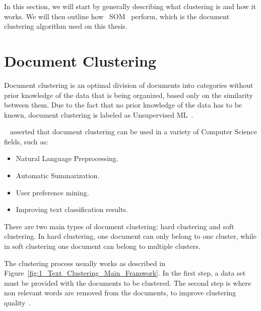 
In this section, we will start by generally describing what clustering is and how it works. We will then outline how ~\ac{SOM}~\cite{Kohonen1990} perform, which is the document clustering algorithm used on this thesis.

\section{Document Clustering}
\label{sec:clustering}
Document clustering is an optimal division of documents into categories without prior knowledge of the data that is being organized, based only on the similarity between them. Due to the fact that no prior knowledge of the data has to be known, document clustering is labeled as Unsupervised \ac{ML}~\cite{hinton1999unsupervised}.

~\citet{Liu2012b} asserted that document clustering can be used in a variety of Computer Science fields, such as:
\begin{itemize}
  \item Natural Language Preprocessing.
  \item Automatic Summarization.
  \item User preference mining.
  \item Improving text classification results.
\end{itemize}

There are two main types of document clustering: hard clustering and soft clustering. In hard clustering, one document can only belong to one cluster, while in soft clustering one document can belong to multiple clusters. 


The clustering process usually works as described in Figure~\ref{fig:1_Text_Clustering_Main_Framwork}. In the first step, a data set must be provided with the documents to be clustered. The second step is where non relevant words are removed from the documents, to improve clustering quality~\cite{Kang2003}. 

